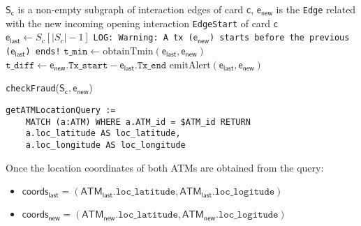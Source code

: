 \begin{itemize}
    \begin{algorithm}[H]
      \small
      \begin{algorithmic}[1]
      \REQUIRE $\mathsf{S_c}$ is a non-empty subgraph of interaction edges of card $\mathsf{c}$, $\mathsf{e_{new}}$ is the \texttt{Edge} related with the new incoming opening interaction \texttt{EdgeStart} of card $\mathsf{c}$
      \STATE $\mathsf{e_{last}} \gets S_c[|S_c| - 1]$ 
          \STATE \texttt{LOG: Warning: A tx ($\mathsf{e_{new}}$) starts before the previous ($\mathsf{e_{last}}$) ends!} 
          \RETURN
      \ENDIF
          \STATE $\texttt{t\_min} \gets \text{obtainTmin}(\mathsf{e_{last}}, \mathsf{e_{new}})$\label{line:obtainTmin}
          \STATE $\texttt{t\_diff} \gets \mathsf{e_{new}}.\texttt{Tx\_start} - \mathsf{e_{last}}.\texttt{Tx\_end}$
            \STATE $\text{emitAlert}(\mathsf{e_{last}}, \mathsf{e_{new}})$\label{line:emitAlert}
          \ENDIF
      \ENDIF
      \end{algorithmic}
      \caption{\texttt{checkFraud}($\mathsf{S_c, e_{new}}$)}
      \label{alg:check-fraud-impl}
    \end{algorithm}

    
    \begin{center}
    \lstset{style=cypherStyle}
    \begin{lstlisting}[caption={Code of the constructed \texttt{Cypher} query in \texttt{Go} to obtain the location coordinates of an ATM with its id on the Neo4j graph database}, label={lst:cypherQueryCoords}]
    getATMLocationQuery := 
    MATCH (a:ATM) WHERE a.ATM_id = $ATM_id RETURN 
    a.loc_latitude AS loc_latitude, 
    a.loc_longitude AS loc_longitude
    \end{lstlisting}
    \end{center}

    Once the location coordinates of both ATMs are obtained from the query:
    \begin{itemize}
        \item  $\mathsf{coords_{last}} = (\mathsf{ATM_{last}}.\texttt{loc\_latitude}, \mathsf{ATM_{last}}.\texttt{loc\_logitude})$ 
        \item  $\mathsf{coords_{new}} = (\mathsf{ATM_{new}}.\texttt{loc\_latitude}, \mathsf{ATM_{new}}.\texttt{loc\_logitude})$
    \end{itemize}
    

\end{itemize}

